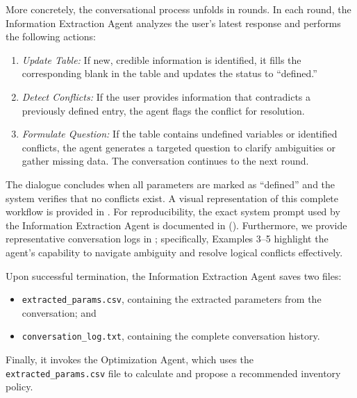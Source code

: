     More concretely, the conversational process unfolds in rounds. In each round, the Information Extraction Agent analyzes the user's latest response and performs the following actions:
    \begin{enumerate}
        \item \emph{Update Table:} If new, credible information is identified, it fills the corresponding blank in the table and updates the status to ``defined.''
        \item \emph{Detect Conflicts:} If the user provides information that contradicts a previously defined entry, the agent flags the conflict for resolution.
        \item \emph{Formulate Question:} If the table contains undefined variables or identified conflicts, the agent generates a targeted question to clarify ambiguities or gather missing data. The conversation continues to the next round.
    \end{enumerate}
    The dialogue concludes when all parameters are marked as ``defined'' and the system verifies that no conflicts exist. A visual representation of this complete workflow is provided in .
    For reproducibility, the exact system prompt used by the Information Extraction Agent is documented in  (). Furthermore, we provide representative conversation logs in ; specifically, Examples 3--5 highlight the agent's capability to navigate ambiguity and resolve logical conflicts effectively.

    
    
    
    Upon successful termination, the Information Extraction Agent saves two files: 
    \begin{itemize} 
        \item \texttt{extracted\_params.csv}, containing the extracted parameters from the conversation; and 
        \item \texttt{conversation\_log.txt}, containing the complete conversation history. 
    \end{itemize}
    Finally, it invokes the Optimization Agent, which uses the \texttt{extracted\_params.csv} file to calculate and propose a recommended inventory policy.


